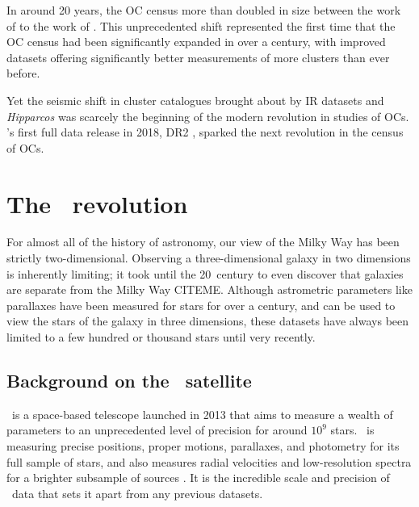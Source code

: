 In around 20 years, the OC census more than doubled in size between the work of \cite{mermilliod_database_1995} to the work of \cite{kharchenko_global_2013}. This unprecedented shift represented the first time that the OC census had been significantly expanded in over a century, with improved datasets offering significantly better measurements of more clusters than ever before. 

Yet the seismic shift in cluster catalogues brought about by IR datasets and \emph{Hipparcos} was scarcely the beginning of the modern revolution in studies of OCs. \gaia's first full data release in 2018, DR2 \citep{brown_gaia_2018}, sparked the next revolution in the census of OCs.


\section{The \gaia\ revolution}
\label{sec:intro:gaia}

For almost all of the history of astronomy, our view of the Milky Way has been strictly two-dimensional. Observing a three-dimensional galaxy in two dimensions is inherently limiting; it took until the 20\third\ century to even discover that galaxies are separate from the Milky Way CITEME. Although astrometric parameters like parallaxes have been measured for stars for over a century, and can be used to view the stars of the galaxy in three dimensions, these datasets have always been limited to a few hundred or thousand stars until very recently. %

\subsection{Background on the \gaia\ satellite}
\label{sec:intro:history:gaia:background}

\gaia\ is a space-based telescope launched in 2013 that aims to measure a wealth of parameters to an unprecedented level of precision for around $10^9$ stars. \gaia\ is measuring precise positions, proper motions, parallaxes, and photometry for its full sample of stars, and also measures radial velocities and low-resolution spectra for a brighter subsample of sources \citep{gaia_collaboration_gaia_2016}. It is the incredible scale and precision of \gaia\ data that sets it apart from any previous datasets.

